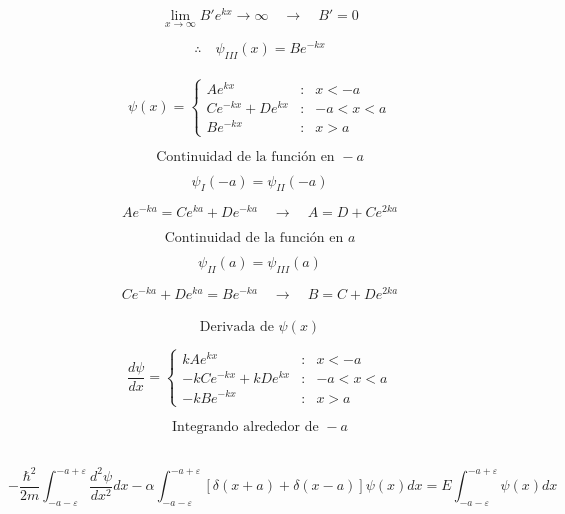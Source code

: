 \documentclass[10pt,a4papper]{article}
\begin{document}
\[\lim_{x\to\infty}B'e^{kx}\to\infty\quad\to\quad B'=0\]

\[\therefore\quad\psi_{III}(x)=Be^{-kx}\]\\

\[\boxed{
  \psi(x)=
  \left\{\begin{array}{ccc}
  Ae^{kx} & : & x<-a \\
  Ce^{-kx}+De^{kx} & : & -a<x<a\\
  Be^{-kx} & : & x>a
\end{array}}\]

\newpage
\[\text{Continuidad de la función en }-a\]

\[\psi_I(-a)=\psi_{II}(-a)\]

\[Ae^{-ka}=Ce^{ka}+De^{-ka}\quad\to\quad\boxed{A=D+Ce^{2ka}}\]

\[\text{Continuidad de la función en }a\]

\[\psi_{II}(a)=\psi_{III}(a)\]

\[Ce^{-ka}+De^{ka}=Be^{-ka}\quad\to\quad\boxed{B=C+De^{2ka}}\]\\

\[\text{Derivada de }\psi(x)\]

\[\boxed{
  \frac{d\psi}{dx}=
  \left\{\begin{array}{ccc}
  kAe^{kx} & : & x<-a \\
  -kCe^{-kx}+kDe^{kx} & : & -a<x<a\\
  -kBe^{-kx} & : & x>a
\end{array}}\]

\newpage
\[\text{Integrando alrededor de }-a\]

\begin{center}
\end{center}\\

\[-\frac{\hbar^2}{2m}\int_{-a-\varepsilon}^{-a+\varepsilon}\frac{d^2\psi}{dx^2}dx
-\alpha\int_{-a-\varepsilon}^{-a+\varepsilon}[\delta(x+a)+\delta(x-a)]\psi(x)dx=
E\int_{-a-\varepsilon}^{-a+\varepsilon}\psi(x)dx\]\\
\end{document}

